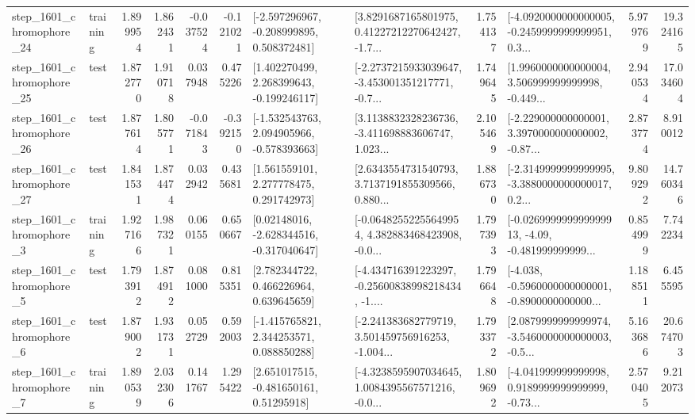 \begin{tabular}{llrrrrllrlrr}
 step\_1601\_chromophore\_24 &  training &      1.899954 &    1.862431 &     -0.037524 & -0.121021 &   [-2.597296967, -0.208999895, 0.508372481] &  [3.8291687165801975, 0.41227212270642427, -1.7... &       1.754137 &  [-4.0920000000000005, -0.2459999999999951, 0.3... &            5.979769 &         19.324165 \\
 step\_1601\_chromophore\_25 &      test &      1.872770 &    1.910718 &      0.037948 &  0.475226 &    [1.402270499, 2.268399643, -0.199246117] &  [-2.2737215933039647, -3.453001351217771, -0.7... &       1.749645 &  [1.9960000000000004, 3.506999999999998, -0.449... &            2.940534 &         17.034604 \\
 step\_1601\_chromophore\_26 &      test &      1.877614 &    1.805771 &     -0.071843 & -0.392150 &   [-1.532543763, 2.094905966, -0.578393663] &  [3.1138832328236736, -3.411698883606747, 1.023... &       2.105469 &  [-2.229000000000001, 3.3970000000000002, -0.87... &            2.873774 &          8.910012 \\
 step\_1601\_chromophore\_27 &      test &      1.841531 &    1.874474 &      0.032942 &  0.435681 &     [1.561559101, 2.277778475, 0.291742973] &  [2.6343554731540793, 3.7137191855309566, 0.880... &       1.886730 &  [-2.3149999999999995, -3.3880000000000017, 0.2... &            9.809292 &         14.760346 \\
  step\_1601\_chromophore\_3 &  training &      1.927166 &    1.987321 &      0.060155 &  0.650667 &    [0.02148016, -2.628344516, -0.317040647] &  [-0.06482552255649954, 4.382883468423908, -0.0... &       1.797393 &  [-0.026999999999999913, -4.09, -0.481999999999... &            0.854999 &          7.742234 \\
  step\_1601\_chromophore\_5 &      test &      1.793912 &    1.874912 &      0.081000 &  0.815351 &     [2.782344722, 0.466226964, 0.639645659] &  [-4.434716391223297, -0.25600838998218434, -1.... &       1.796648 &  [-4.038, -0.5960000000000001, -0.8900000000000... &            1.188511 &          6.455595 \\
  step\_1601\_chromophore\_6 &      test &      1.879002 &    1.931731 &      0.052729 &  0.592003 &    [-1.415765821, 2.344253571, 0.088850288] &  [-2.241383682779719, 3.501459756916253, -1.004... &       1.793372 &  [2.0879999999999974, -3.5460000000000003, -0.5... &            5.163686 &         20.674703 \\
  step\_1601\_chromophore\_7 &  training &      1.890539 &    2.032306 &      0.141767 &  1.295422 &     [2.651017515, -0.481650161, 0.51295918] &  [-4.3238595907034645, 1.0084395567571216, -0.0... &       1.809692 &  [-4.041999999999998, 0.9189999999999999, -0.73... &            2.570405 &          9.212073 \\

\end{tabular}
